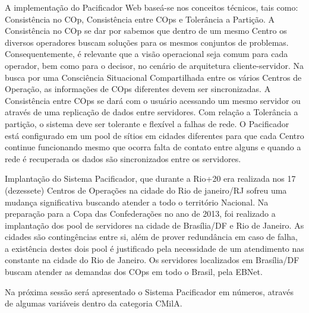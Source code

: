 A implementação do Pacificador Web baseá-se nos conceitos técnicos, tais como: Consistência no COp, Consistência entre COps e Tolerância a Partição. A Consistência no COp se dar por sabemos que dentro de um mesmo Centro os diversos operadores buscam soluções para os mesmos conjuntos de problemas. Consequentemente, é relevante que a visão operacional seja comum para cada operador, bem como para o decisor, no cenário de arquitetura cliente-servidor. Na busca por uma Consciência Situacional Compartilhada entre os vários Centros de Operação, as informações de COps diferentes devem ser sincronizadas. A Consistência entre COps se dará com o usuário acessando um mesmo servidor ou através de uma replicação de dados entre servidores. Com relação a Tolerância a partição, o sistema deve ser tolerante e flexível a falhas de rede. O Pacificador está configurado em um pool de sítios em cidades diferentes para que cada Centro continue funcionando mesmo que ocorra falta de contato entre alguns e quando a rede é recuperada os dados são sincronizados entre os servidores.

Implantação do Sistema Pacificador, que durante a Rio+20 era realizada nos 17 (dezessete) Centros de Operações na cidade do Rio de janeiro/RJ sofreu uma mudança significativa buscando atender a todo o território Nacional. Na preparação para a Copa
das Confederações no ano de 2013, foi realizado a implantação dos pool de servidores na cidade de Brasília/DF e Rio de Janeiro. As cidades são contingências entre si, além de prover redundância em caso de falha, a existência destes dois pool é justificado pela necessidade de um atendimento nas constante na cidade do Rio de Janeiro. Os servidores localizados em Brasília/DF buscam atender as demandas dos COps em todo o Brasil, pela EBNet.

Na próxima sessão será apresentado o Sistema Pacificador em números, através de algumas variáveis dentro da categoria CMilA.
